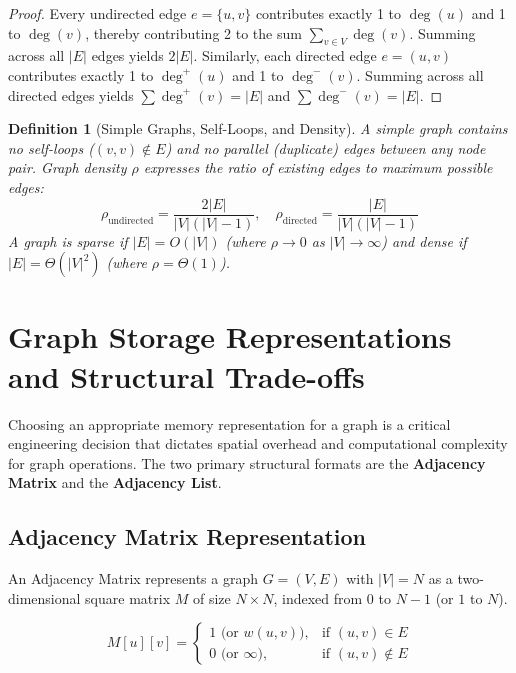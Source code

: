 \documentclass[10pt,journal,compsoc,onecolumn]{IEEEtran}
\newtheorem{definition}[theorem]{Definition}
\begin{document}
\begin{proof}
Every undirected edge $e = \{u, v\}$ contributes exactly 1 to $\deg(u)$ and 1 to $\deg(v)$, thereby contributing 2 to the sum $\sum_{v \in V} \deg(v)$. Summing across all $|E|$ edges yields $2|E|$. Similarly, each directed edge $e = (u, v)$ contributes exactly 1 to $\deg^+(u)$ and 1 to $\deg^-(v)$. Summing across all directed edges yields $\sum \deg^+(v) = |E|$ and $\sum \deg^-(v) = |E|$.
\end{proof}

\begin{definition}[Simple Graphs, Self-Loops, and Density]
A \emph{simple graph} contains no self-loops ($(v, v) \notin E$) and no parallel (duplicate) edges between any node pair. Graph density $\rho$ expresses the ratio of existing edges to maximum possible edges:
\begin{equation}
\rho_{\text{undirected}} = \frac{2|E|}{|V|(|V|-1)}, \quad \rho_{\text{directed}} = \frac{|E|}{|V|(|V|-1)}
\end{equation}
A graph is \emph{sparse} if $|E| = O(|V|)$ (where $\rho \to 0$ as $|V| \to \infty$) and \emph{dense} if $|E| = \Theta(|V|^2)$ (where $\rho = \Theta(1)$).
\end{definition}

\section{Graph Storage Representations and Structural Trade-offs}
\label{sec:representations}

Choosing an appropriate memory representation for a graph is a critical engineering decision that dictates spatial overhead and computational complexity for graph operations. The two primary structural formats are the \textbf{Adjacency Matrix} and the \textbf{Adjacency List}.

\subsection{Adjacency Matrix Representation}

An Adjacency Matrix represents a graph $G = (V, E)$ with $|V| = N$ as a two-dimensional square matrix $M$ of size $N \times N$, indexed from $0$ to $N-1$ (or $1$ to $N$).

\begin{equation}
M[u][v] = \begin{cases}
1 \text{ (or } w(u, v) \text{)}, & \text{if } (u, v) \in E \\
0 \text{ (or } \infty \text{)}, & \text{if } (u, v) \notin E
\end{cases}
\end{equation}
\end{document}
